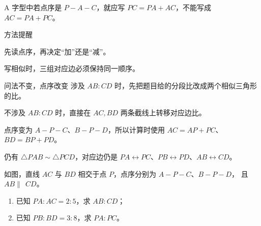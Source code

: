 \documentclass{exam-zh}
\begin{document}
\begin{eduMistakeBox}
A 字型中若点序是 $P-A-C$，就应写 $PC=PA+AC$，不能写成 $AC=PA+PC$。\end{eduMistakeBox}




\begin{eduSummaryBlock}{\eduIconPin}{方法提醒}
\begin{eduBulletList}
  \item 先读点序，再决定“加”还是“减”。  \item 写相似时，三组对应边必须保持同一顺序。\end{eduBulletList}
\end{eduSummaryBlock}



\clearpage
{}


\begin{eduSolutionBox}{问法不变，点序改变}
  \begingroup
  \setlength{\parskip}{2.5mm}
涉及 $AB:CD$ 时，先把题目给的分段比改成两个相似三角形的比。\par
不涉及 $AB:CD$ 时，直接在 $AC,BD$ 两条截线上转移对应边比。\par
点序变为 $A-P-C$、$B-P-D$，所以计算时使用 $AC=AP+PC$、$BD=BP+PD$。\par
仍有 $\triangle PAB\sim\triangle PCD$，对应边仍是 $PA\leftrightarrow PC$、$PB\leftrightarrow PD$、$AB\leftrightarrow CD$。\par
  \endgroup
\end{eduSolutionBox}




\begin{eduProblemBlock}[8 字型例题]
\noindent
\begin{minipage}[t]{\dimexpr\linewidth-70mm-6mm\relax}
\vspace{0pt}
如图，直线 $AC$ 与 $BD$ 相交于点 $P$，点序分别为 $A-P-C$、$B-P-D$，
且 $AB\parallel\ \ CD$。
\begin{enumerate}[label=(\arabic*)]
  \item 已知 $PA:AC=2:5$，求 $AB:CD$；
\ \  \item 已知 $PB:BD=3:8$，求 $PA:PC$。
\end{enumerate}

\end{minipage}\hfill
\begin{diagramcoltikz}{70mm}{交点 $P$ 在两条平行线之间，先看清两条截线的点序。}
}
\end{diagramcoltikz}
\end{eduProblemBlock}
\end{document}
